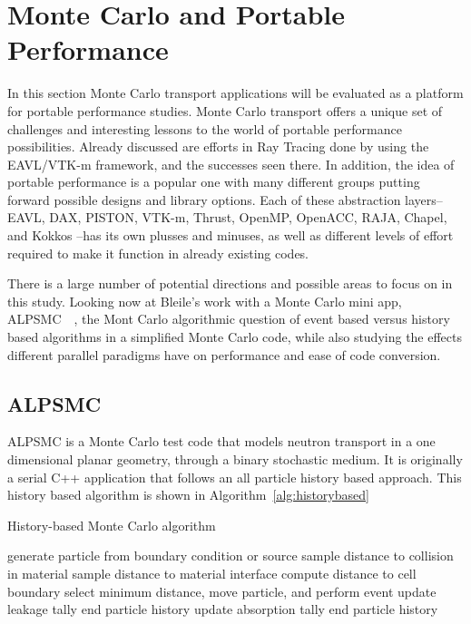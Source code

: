 \section{\textbf{Monte Carlo and Portable Performance}}

In this section Monte Carlo transport applications will be evaluated as a platform for portable performance studies.
%
Monte Carlo transport offers a unique set of challenges and interesting lessons to the world of portable performance possibilities.
%
Already discussed are efforts in Ray Tracing done by using the EAVL/VTK-m framework, and the successes seen there. 
%
In addition, the idea of portable performance is a popular one with many different groups putting forward possible designs and library options.
%
Each of these abstraction layers-- EAVL, DAX, PISTON, VTK-m, Thrust, OpenMP, OpenACC, RAJA, Chapel, and Kokkos --has its own plusses and minuses, as well as different levels of effort required to make it function in already existing codes.
%

%
There is a large number of potential directions and possible areas to focus on in this study.
%
Looking now at Bleile's work with a Monte Carlo mini app, ALPSMC~\cite{}~\cite{}, the Mont Carlo algorithmic question of event based versus history based algorithms in a simplified Monte Carlo code, while also studying the effects different parallel paradigms have on performance and ease of code conversion.
%

\subsection{\textbf{ALPSMC}}

ALPSMC is a Monte Carlo test code that models neutron transport in a one dimensional planar geometry, through a binary stochastic medium.
%
It is originally a serial C++ application that follows an all particle history based approach.
%
This history based algorithm is shown in Algorithm~\ref{alg:historybased}
%

\begin{algorithm}
\DontPrintSemicolon
\caption{History-based Monte Carlo algorithm}
\label{alg:historybased}
{ 
    generate particle from boundary condition or source\;
    {
       sample distance to collision in material\;
       sample distance to material interface\;
       compute distance to cell boundary\;
       select minimum distance, move particle, and perform event\;
       {
          update leakage tally\;
          end particle history\;
       }
       {
          update absorption tally\;
          end particle history\;
       }
    }
}
\end{algorithm}
%

